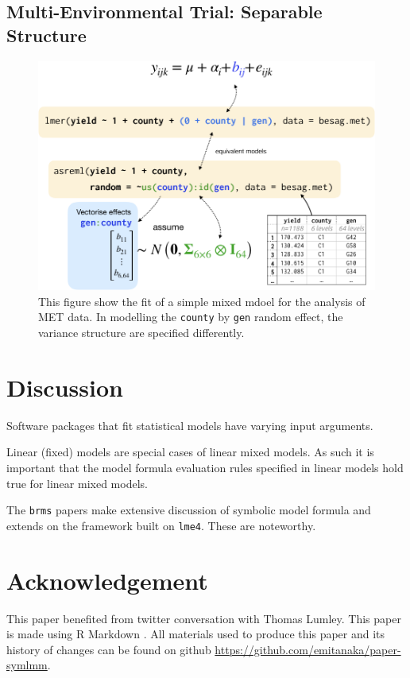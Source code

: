 \documentclass[runningheads]{llncs}
\begin{document}
\hypertarget{MET}{%
\subsection{Multi-Environmental Trial: Separable Structure}\label{MET}}

\begin{figure}
\includegraphics[width=0.9\linewidth,fbox]{images/symbolic_lmm2} \caption{This figure show the fit of a simple mixed mdoel for the analysis of MET data. In modelling the \texttt{county} by \texttt{gen} random effect, the variance structure are specified differently.}\label{fig:symbolic-lmm2}
\end{figure}



\hypertarget{discussion}{%
\section{Discussion}\label{discussion}}

Software packages that fit statistical models have varying input arguments.

Linear (fixed) models are special cases of linear mixed models. As such it is important that the model formula evaluation rules specified in linear models hold true for linear mixed models.

The \texttt{brms} papers make extensive discussion of symbolic model formula and extends on the framework built on \texttt{lme4}. These are noteworthy.

\section*{Acknowledgement}

This paper benefited from twitter conversation with Thomas Lumley. This paper is made using R Markdown \autocite{rmarkdown}. All materials used to produce this paper and its history of changes can be found on github \url{https://github.com/emitanaka/paper-symlmm}.

\printbibliography[title=References]
\end{document}
